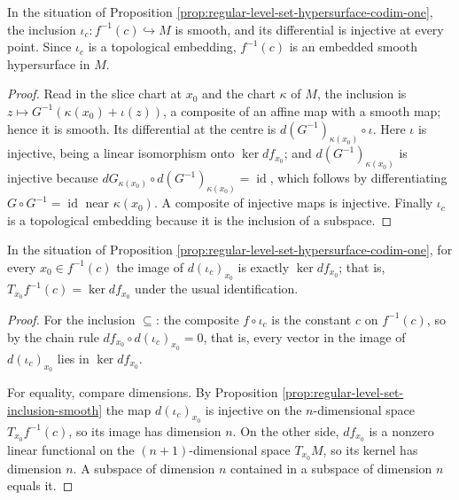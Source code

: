 \begin{proposition}
\label{prop:regular-level-set-inclusion-smooth}





In the situation of Proposition \ref{prop:regular-level-set-hypersurface-codim-one}, the inclusion $\iota_c : f^{-1}(c) \hookrightarrow M$ is smooth, and its differential is injective at every point. Since $\iota_c$ is a topological embedding, $f^{-1}(c)$ is an embedded smooth hypersurface in $M$.
\end{proposition}

\begin{proof}

Read in the slice chart at $x_0$ and the chart $\kappa$ of $M$, the inclusion is $z \mapsto G^{-1}(\kappa(x_0) + \iota(z))$, a composite of an affine map with a smooth map; hence it is smooth. Its differential at the centre is $d(G^{-1})_{\kappa(x_0)} \circ \iota$. Here $\iota$ is injective, being a linear isomorphism onto $\ker df_{x_0}$; and $d(G^{-1})_{\kappa(x_0)}$ is injective because $dG_{\kappa(x_0)} \circ d(G^{-1})_{\kappa(x_0)} = \operatorname{id}$, which follows by differentiating $G \circ G^{-1} = \operatorname{id}$ near $\kappa(x_0)$. A composite of injective maps is injective. Finally $\iota_c$ is a topological embedding because it is the inclusion of a subspace.
\end{proof}

\begin{proposition}
\label{prop:regular-level-set-tangent-kernel}





In the situation of Proposition \ref{prop:regular-level-set-hypersurface-codim-one}, for every $x_0 \in f^{-1}(c)$ the image of $d(\iota_c)_{x_0}$ is exactly $\ker df_{x_0}$; that is, $T_{x_0} f^{-1}(c) = \ker df_{x_0}$ under the usual identification.
\end{proposition}

\begin{proof}

For the inclusion $\subseteq$: the composite $f \circ \iota_c$ is the constant $c$ on $f^{-1}(c)$, so by the chain rule $df_{x_0} \circ d(\iota_c)_{x_0} = 0$, that is, every vector in the image of $d(\iota_c)_{x_0}$ lies in $\ker df_{x_0}$.

For equality, compare dimensions. By Proposition \ref{prop:regular-level-set-inclusion-smooth} the map $d(\iota_c)_{x_0}$ is injective on the $n$-dimensional space $T_{x_0} f^{-1}(c)$, so its image has dimension $n$. On the other side, $df_{x_0}$ is a nonzero linear functional on the $(n+1)$-dimensional space $T_{x_0}M$, so its kernel has dimension $n$. A subspace of dimension $n$ contained in a subspace of dimension $n$ equals it.
\end{proof}

